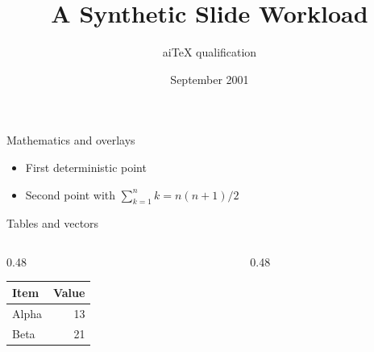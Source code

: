 \documentclass{beamer}
\title{A Synthetic Slide Workload}
\author{aiTeX qualification}
\date{September 2001}
\begin{document}
\begin{frame}
  \titlepage
\end{frame}

\begin{frame}{Mathematics and overlays}
  \begin{itemize}
    \item<1-> First deterministic point
    \item<2-> Second point with $\sum_{k=1}^{n}k=n(n+1)/2$
  \end{itemize}
\end{frame}

\begin{frame}{Tables and vectors}
  \begin{columns}
    \begin{column}{0.48\textwidth}
      \begin{tabular}{lr}
        \toprule Item & Value \\
        \midrule Alpha & 13 \\
        Beta & 21 \\
        \bottomrule
      \end{tabular}
    \end{column}
    \begin{column}{0.48\textwidth}
    \end{column}
  \end{columns}
\end{frame}
\end{document}
